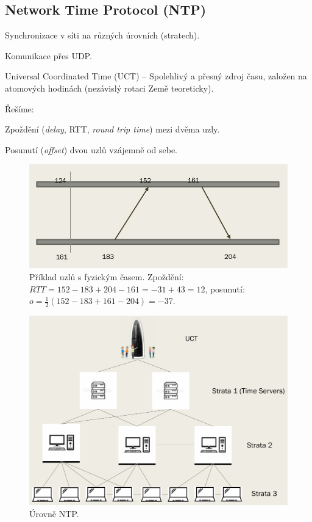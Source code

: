 \subsection{Network Time Protocol (NTP)}

\begin{compactitem}
    \item Synchronizace v síti na různých úrovních (stratech).
    \item Komunikace přes UDP.
    \item Universal Coordinated Time (UCT) -- Spolehlivý a přesný zdroj času, založen na atomových hodinách (nezávislý rotaci Země teoreticky).

    \item Řešíme: \begin{compactitem}
        \item Zpoždění (\textit{delay}, RTT, \textit{round trip time}) mezi dvěma uzly.
        \item Posunutí (\textit{offset}) dvou uzlů vzájemně od sebe.
    \end{compactitem}

    \begin{figure}[H]
        \centering
        \includegraphics[width=1\linewidth]{ntp_priklad.pdf}
        \caption{Příklad uzlů s fyzickým časem. Zpoždění: $RTT = 152-183 + 204-161= -31 +43 = 12 $, posunutí: $o = \frac{1}{2} (152-183+161-204) = -37 $.}
    \end{figure}

    \begin{figure}[H]
        \centering
        \includegraphics[width=1\linewidth]{ntp.pdf}
        \caption{Úrovně NTP.}
    \end{figure}


\end{compactitem}
